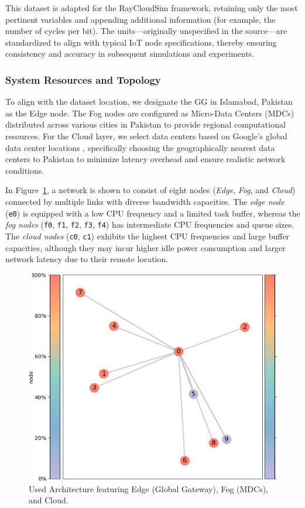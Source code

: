 \documentclass{svproc}
\begin{document}
This dataset is adapted for the RayCloudSim framework, retaining only the most pertinent variables and appending additional information (for example, the number of cycles per bit). The units—originally unspecified in the source—are standardized to align with typical IoT node specifications, thereby ensuring consistency and accuracy in subsequent simulations and experiments.

\subsubsection{System Resources and Topology}\label{subsec:system_resources_topology}

To align with the dataset location, we designate the GG in Islamabad, Pakistan as the Edge node. The Fog nodes are configured as Micro-Data Centers (MDCs) distributed across various cities in Pakistan to provide regional computational resources. For the Cloud layer, we select data centers based on Google's global data center locations \citep{googleDataCenters}, specifically choosing the geographically nearest data centers to Pakistan to minimize latency overhead and ensure realistic network conditions.


In Figure~\ref{fig:used_architecture}, a network is shown to consist of eight nodes (\textit{Edge}, \textit{Fog}, and \textit{Cloud}) connected by multiple links with diverse bandwidth capacities. The \textit{edge node} (\texttt{e0}) is equipped with a low CPU frequency and a limited task buffer, whereas the \textit{fog nodes} (\texttt{f0}, \texttt{f1}, \texttt{f2}, \texttt{f3}, \texttt{f4}) has intermediate CPU frequencies and queue sizes. The \textit{cloud nodes} (\texttt{c0}, \texttt{c1}) exhibits the highest CPU frequencies and large buffer capacities, although they may incur higher idle power consumption and larger network latency due to their remote location.

\begin{figure}[H]
    \centering
    \includegraphics[width=0.75\linewidth]{figs/used_architecture.png}
    \caption{Used Architecture featuring Edge (Global Gateway), Fog (MDCs), and Cloud.}\label{fig:used_architecture}
\end{figure}
\end{document}
